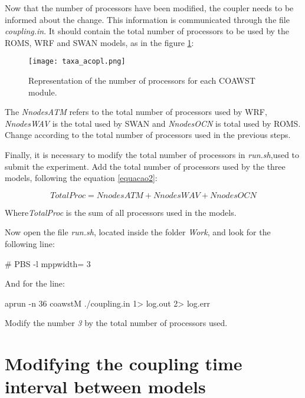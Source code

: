  Now that the number of processors have been modified, the coupler needs to be informed about the change. 
This information is communicated through the file \textit{coupling.in}. It should contain the total number of processors 
to be used by the ROMS, WRF and SWAN models, as in the figure \textcolor{bleu_cite}{\ref{procscoa}}:
\bigskip

\begin{figure}[H]
    \centering
    \texttt{[image: taxa\_acopl.png]}
    \caption{Representation of the number of processors for each COAWST module.}
    \label{procscoa}
\end{figure}
\bigskip

 The \textit{NnodesATM} refers to the total number of processors used by WRF, \textit{NnodesWAV} is the
total used by SWAN and \textit{NnodesOCN} is total used by ROMS. Change according to the total number of processors used
in the previous steps.
\bigskip

 Finally, it is necessary to modify the total number of processors in \textit{run.sh},used to submit the experiment.
Add the total number of processors used by the three models, following the equation \textcolor{bleu_cite}{\ref{equacao2}}:
\bigskip

\begin{equation}
TotalProc = NnodesATM + NnodesWAV + NnodesOCN
\label{equacao2}
\end{equation}
\bigskip

 Where\textit{TotalProc} is the sum of all processors used in the models.
\bigskip

 Now open the file \textit{run.sh}, located inside the folder \textit{Work}, and look for the following line:
\bigskip

\begin{bashcode}
\# PBS -l mppwidth= 3
\end{bashcode}
\bigskip

 And for the line:
\bigskip

\begin{bashcode}
aprun -n 36 coawstM ./coupling.in 1> log.out 2> log.err
\end{bashcode}
\bigskip

 Modify the number \textit{3} by the total number of processors used.
\bigskip

\section{Modifying the coupling time interval between models}
\bigskip

